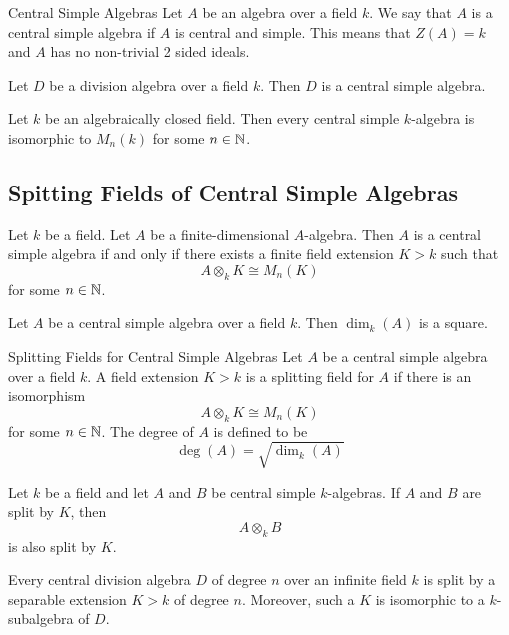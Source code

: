 \documentclass[a4paper]{article}
\begin{document}
\begin{defn}{Central Simple Algebras}{} Let $A$ be an algebra over a field $k$. We say that $A$ is a central simple algebra if $A$ is central and simple. This means that $Z(A)=k$ and $A$ has no non-trivial 2 sided ideals. 
\end{defn}

\begin{lmm}{}{} Let $D$ be a division algebra over a field $k$. Then $D$ is a central simple algebra. 
\end{lmm}

\begin{thm}{}{} Let $k$ be an algebraically closed field. Then every central simple $k$-algebra is isomorphic to $M_n(k)$ for some $n\in\mathbb{N}$. 
\end{thm}

\subsection{Spitting Fields of Central Simple Algebras}
\begin{thm}{}{} Let $k$ be a field. Let $A$ be a finite-dimensional $A$-algebra. Then $A$ is a central simple algebra if and only if there exists a finite field extension $K>k$ such that $$A\otimes_k K\cong M_n(K)$$ for some $n\in\mathbb{N}$. 
\end{thm}

\begin{crl}{}{} Let $A$ be a central simple algebra over a field $k$. Then $\dim_k(A)$ is a square. 
\end{crl}

\begin{defn}{Splitting Fields for Central Simple Algebras}{} Let $A$ be a central simple algebra over a field $k$. A field extension $K>k$ is a splitting field for $A$ if there is an isomorphism $$A\otimes_kK\cong M_n(K)$$ for some $n\in\mathbb{N}$. The degree of $A$ is defined to be $$\deg(A)=\sqrt{\dim_k(A)}$$
\end{defn}

\begin{lmm}{}{} Let $k$ be a field and let $A$ and $B$ be central simple $k$-algebras. If $A$ and $B$ are split by $K$, then $$A\otimes_k B$$ is also split by $K$. 
\end{lmm}

\begin{thm}{}{} Every central division algebra $D$ of degree $n$ over an infinite field $k$ is split by a separable extension $K>k$ of degree $n$. Moreover, such a $K$ is isomorphic to a $k$-subalgebra of $D$. 
\end{thm}
\end{document}

